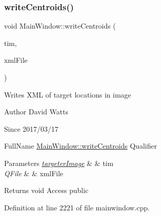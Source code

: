 \subsubsection{\texorpdfstring{write\+Centroids()}{writeCentroids()}}
{\footnotesize\ttfamily void Main\+Window\+::write\+Centroids (\begin{DoxyParamCaption}\item[{\hyperlink{classtargeter_image}{targeter\+Image} \&}]{tim,  }\item[{Q\+File \&}]{xml\+File }\end{DoxyParamCaption})}

Writes X\+ML of target locations in image

\begin{DoxyAuthor}{Author}
David Watts 
\end{DoxyAuthor}
\begin{DoxySince}{Since}
2017/03/17
\end{DoxySince}
Full\+Name \hyperlink{class_main_window_aa137f4371bae807873da7862f4102521}{Main\+Window\+::write\+Centroids} Qualifier 
\begin{DoxyParams}{Parameters}
{\em \hyperlink{classtargeter_image}{targeter\+Image}} & \& tim \\
\hline
{\em Q\+File} & \& xml\+File \\
\hline
\end{DoxyParams}
\begin{DoxyReturn}{Returns}
void Access public 
\end{DoxyReturn}


Definition at line 2221 of file mainwindow.\+cpp.

